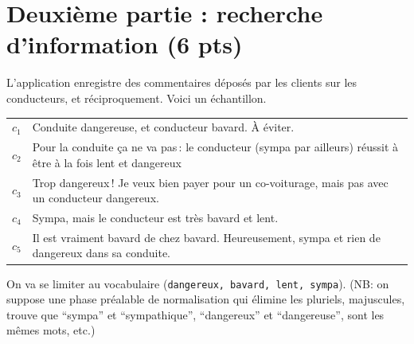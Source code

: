 \documentclass[10pt,a4paper]{article}
\begin{document}
\section*{Deuxième partie : recherche d'information (6 pts)}

L'application enregistre des commentaires déposés par les clients sur les conducteurs, et réciproquement. 
Voici un échantillon.

\vspace*{0.3cm}

\begin{tabular}{lp{15cm}}
     $c_1$& Conduite dangereuse, et conducteur bavard. \`A éviter.\\
     $c_2$& Pour la conduite ça ne va pas\,: le conducteur (sympa par ailleurs)
         réussit à être à la fois lent et dangereux\\
     $c_3$& Trop dangereux\,! Je veux bien payer pour un co-voiturage, mais
          pas avec un conducteur dangereux.\\
     $c_4$& Sympa, mais le conducteur est très bavard et lent.\\
     $c_5$& Il est vraiment bavard de chez bavard. Heureusement, sympa et rien
         de dangereux dans sa conduite.\\ 
\end{tabular}
             
On va se limiter au vocabulaire (\texttt{dangereux, bavard, lent, sympa}).
(NB: on suppose
     une phase préalable de normalisation qui élimine les pluriels, majuscules, trouve
     que ``sympa'' et ``sympathique'', ``dangereux'' et ``dangereuse'',  sont les mêmes mots, etc.)
\end{document}
